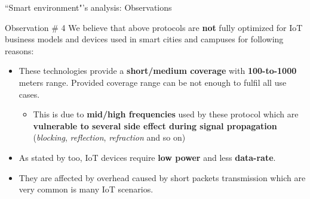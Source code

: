 \documentclass[10pt]{beamer}
\begin{document}
\begin{frame}{``Smart environment"'s analysis: Observations}

\begin{alertblock}{Observation \# 4}
\justifying
We believe that above protocols are \textbf{not} fully optimized for IoT business models and devices used in smart cities and campuses for following reasons:

\begin{itemize}
\justifying
\item These technologies provide a \textbf{short/medium coverage} with \textbf{100-to-1000} meters range. Provided coverage range can be not enough to fulfil all use cases.

\begin{itemize}
\item This is due to \textbf{mid/high frequencies} used by these protocol which are \textbf{vulnerable to several side effect during signal propagation} (\textit{blocking}, \textit{reflection}, \textit{refraction} and so on)
\end{itemize}


\item As stated by \citet{ITPAReport} too, IoT devices require \textbf{low power} and less \textbf{data-rate}.

\item They are affected by overhead caused by short packets transmission which are very common is many IoT scenarios.

\end{itemize}
\end{alertblock}


\end{frame} 
\end{document}
